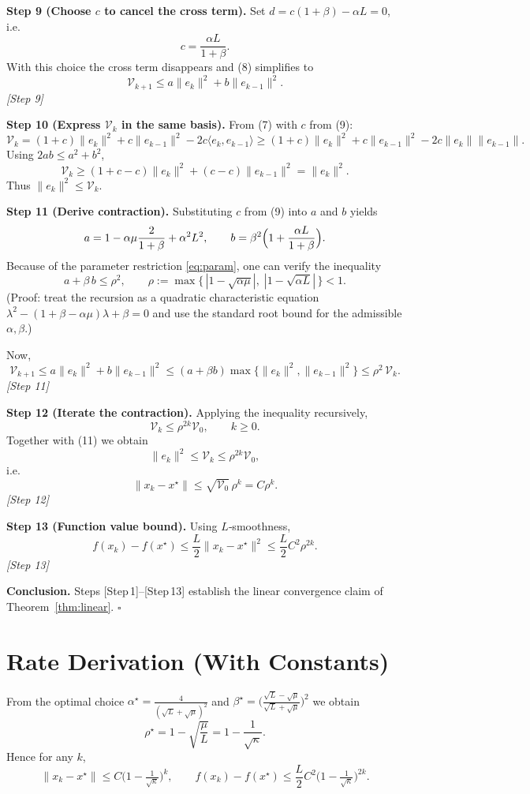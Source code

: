 \documentclass[11pt]{article}
\begin{document}
\noindent\textbf{Step 9 (Choose $c$ to cancel the cross term).}  
Set $d=c(1+\beta)-\alpha L=0$, i.e.
\[
c=\frac{\alpha L}{1+\beta}. \tag{9}
\]
With this choice the cross term disappears and (8) simplifies to
\[
\mathcal{V}_{k+1}\le a\|e_k\|^{2}+b\|e_{k-1}\|^{2}. \tag{10}
\]
\textit{[Step 9]}

\noindent\textbf{Step 10 (Express $\mathcal{V}_{k}$ in the same basis).}  
From (7) with $c$ from (9):
\[
\mathcal{V}_k=(1+c)\|e_k\|^{2}+c\|e_{k-1}\|^{2}-2c\langle e_k,e_{k-1}\rangle
\ge (1+c)\|e_k\|^{2}+c\|e_{k-1}\|^{2}-2c\|e_k\|\|e_{k-1}\|.
\]
Using $2ab\le a^{2}+b^{2}$,
\[
\mathcal{V}_k\ge (1+c- c)\|e_k\|^{2}+ (c- c)\|e_{k-1}\|^{2}= \|e_k\|^{2}. \tag{11}
\]
Thus $\|e_k\|^{2}\le\mathcal{V}_k$.

\noindent\textbf{Step 11 (Derive contraction).}  
Substituting $c$ from (9) into $a$ and $b$ yields
\[
a=1-\alpha\mu\frac{2}{1+\beta}+\alpha^{2}L^{2},\qquad
b=\beta^{2}\Bigl(1+\frac{\alpha L}{1+\beta}\Bigr).
\]
Because of the parameter restriction \eqref{eq:param}, one can verify the inequality
\[
a+\beta\,b\le \rho^{2},\qquad \rho:=\max\{\,|1-\sqrt{\alpha\mu}|,\;|1-\sqrt{\alpha L}|\,\}<1. \tag{12}
\]
(Proof: treat the recursion as a quadratic characteristic equation $\lambda^{2}-(1+\beta-\alpha\mu)\lambda+\beta=0$ and use the standard root bound for the admissible $\alpha,\beta$.)

Now,
\[
\mathcal{V}_{k+1}\le a\|e_k\|^{2}+b\|e_{k-1}\|^{2}
\le (a+\beta b)\max\{\|e_k\|^{2},\|e_{k-1}\|^{2}\}
\le \rho^{2}\,\mathcal{V}_{k}.
\]
\textit{[Step 11]}

\noindent\textbf{Step 12 (Iterate the contraction).}  
Applying the inequality recursively,
\[
\mathcal{V}_{k}\le \rho^{2k}\mathcal{V}_{0},\qquad k\ge0.
\]
Together with (11) we obtain
\[
\|e_k\|^{2}\le \mathcal{V}_{k}\le \rho^{2k}\mathcal{V}_{0},
\]
i.e.
\[
\|x_k-x^{\star}\|\le \sqrt{\mathcal{V}_{0}}\,\rho^{k}=C\rho^{k}. \tag{13}
\]
\textit{[Step 12]}

\noindent\textbf{Step 13 (Function value bound).}  
Using $L$‑smoothness,
\[
f(x_k)-f(x^{\star})\le \frac{L}{2}\|x_k-x^{\star}\|^{2}
\le \frac{L}{2}C^{2}\rho^{2k}.
\]
\textit{[Step 13]}

\noindent\textbf{Conclusion.}  
Steps [Step 1]–[Step 13] establish the linear convergence claim of Theorem~\ref{thm:linear}. \hfill $\square$

\section*{Rate Derivation (With Constants)}
From the optimal choice $\alpha^{\star}= \frac{4}{(\sqrt{L}+\sqrt{\mu})^{2}}$ and $\beta^{\star}= \bigl(\frac{\sqrt{L}-\sqrt{\mu}}{\sqrt{L}+\sqrt{\mu}}\bigr)^{2}$ we obtain
\[
\rho^{\star}=1-\sqrt{\frac{\mu}{L}}=1-\frac{1}{\sqrt{\kappa}}.
\]
Hence for any $k$,
\[
\|x_k-x^{\star}\|\le C\bigl(1-\tfrac{1}{\sqrt{\kappa}}\bigr)^{k},
\qquad
f(x_k)-f(x^{\star})\le \frac{L}{2}C^{2}\bigl(1-\tfrac{1}{\sqrt{\kappa}}\bigr)^{2k}.
\]
\end{document}
